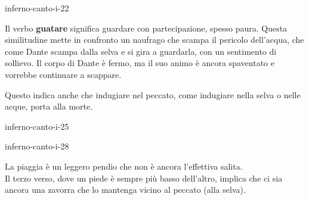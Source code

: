 \documentclass[preview]{standalone}
\begin{document}
\begin{snippet}{inferno-canto-i-22}

    Il verbo \textbf{guatare} significa guardare con partecipazione, spesso paura.
    Questa similitudine mette in confronto un naufrago che scampa il pericolo dell'acqua,
    che come Dante scampa dalla selva e si gira a guardarla, con un sentimento di sollievo.
    Il corpo di Dante è fermo, ma il suo animo è ancora spaventato e vorrebbe continuare a scappare.
    
    Questo indica anche che indugiare nel peccato, come indugiare nella selva o nelle acque, porta alla morte.
\end{snippet}

\begin{snippet}{inferno-canto-i-25}

\end{snippet}

\begin{snippet}{inferno-canto-i-28}

    La piaggia è un leggero pendio che non è ancora l'effettiva salita.
    \\
    Il terzo verso, dove un piede è sempre più basso dell'altro,
    implica che ci sia ancora una zavorra che lo mantenga vicino al peccato (alla selva).
\end{snippet}
\end{document}
